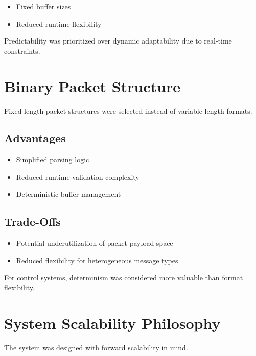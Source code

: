 \begin{itemize}
	\item Fixed buffer sizes
	\item Reduced runtime flexibility
\end{itemize}

Predictability was prioritized over dynamic adaptability due to real-time constraints.


\section{Binary Packet Structure}

Fixed-length packet structures were selected instead of variable-length formats.

\subsection{Advantages}

\begin{itemize}
	\item Simplified parsing logic
	\item Reduced runtime validation complexity
	\item Deterministic buffer management
\end{itemize}

\subsection{Trade-Offs}

\begin{itemize}
	\item Potential underutilization of packet payload space
	\item Reduced flexibility for heterogeneous message types
\end{itemize}

For control systems, determinism was considered more valuable than format flexibility.


\section{System Scalability Philosophy}

The system was designed with forward scalability in mind.

